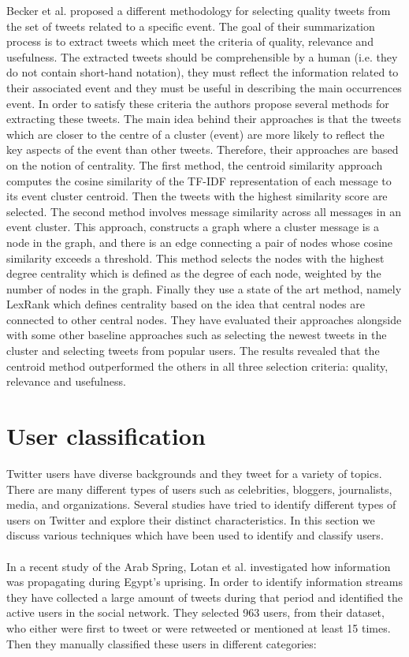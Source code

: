 Becker et al. \cite{Becker_Gravano_2010} proposed a different methodology for selecting quality tweets from the set of tweets related to a specific event. The goal of their summarization process is to extract tweets which meet the criteria of quality, relevance and usefulness. The extracted tweets should be comprehensible by a human (i.e. they do not contain short-hand notation), they must reflect the information related to their associated event and they must be useful in describing the main occurrences event. In order to satisfy these criteria the authors propose several methods for extracting these tweets. The main idea behind their approaches is that the tweets which are closer to the centre of a cluster (event) are more likely to reflect the key aspects of the event than other tweets. Therefore, their approaches are based on the notion of centrality. The first method, the centroid similarity approach computes the cosine similarity of the TF-IDF representation of each message to its event cluster centroid. Then the tweets with the highest similarity score are selected. The second method involves message similarity across all messages in an event cluster. This approach, constructs a graph where a cluster message is a node in the graph, and there is an edge connecting a pair of nodes whose cosine similarity exceeds a threshold. This method selects the nodes with the highest degree centrality which is defined as the degree of each node, weighted by the number of nodes in the graph. Finally they use a state of the art method, namely LexRank which defines centrality based on the idea that central nodes are connected to other central nodes. They have evaluated their approaches alongside with some other baseline approaches such as selecting the newest tweets in the cluster and selecting tweets from popular users. The results revealed that the centroid method outperformed the others in all three selection criteria: quality, relevance and usefulness. 

\section{User classification }\label{sec:UserClassificationBack}
Twitter users have diverse backgrounds and they tweet for a variety of topics. There are many different types of users such as celebrities, bloggers, journalists, media, and organizations. Several studies have tried to identify different types of users on Twitter and explore their distinct characteristics. In this section we discuss various techniques which have been used to identify and classify users. \\\\
In a recent study of the Arab Spring, Lotan et al. \cite{Lotan} investigated how information was propagating during Egypt's	 uprising. In order to identify information streams they have collected a large amount of tweets during that period and identified the active users in the social network. They selected 963 users, from their dataset, who either were first to tweet or were retweeted or mentioned at least 15 times. Then they manually classified these users in different categories:\\
	 

